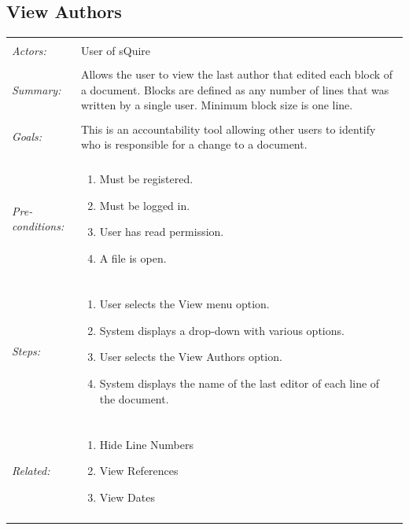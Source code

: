\documentclass[11pt]{report}
\begin{document}
\subsection{View Authors}
\begin{tabular}{ p{2cm} p{12cm} }
\hline
\\
	\textit{Actors:} & User of sQuire \\
	\\
	\textit{Summary:} & Allows the user to view the last author that edited each block of a document. Blocks are defined as any number of lines that was written by a single user. Minimum block size is one line. \\
	\\
	\textit{Goals:} & This is an accountability tool allowing other users to identify who is responsible for a change to a document. \\
	\\
	\textit{Pre-conditions:} & 
	\begin{enumerate}
		\item Must be registered.
		\item Must be logged in.
		\item User has read permission.
		\item A file is open.
	\end{enumerate} \\
	\\
	\textit{Steps:} & \begin{enumerate}
		\item User selects the View menu option.
		\item System displays a drop-down with various options.
		\item User selects the View Authors option.
		\item System displays the name of the last editor of each line of the document.
	\end{enumerate} \\
	\\
	\textit{Related:} & \begin{enumerate}
		\item Hide Line Numbers
		\item View References
		\item View Dates
	\end{enumerate} \\
	\\
\hline
\end{tabular}
\newpage
\end{document}
